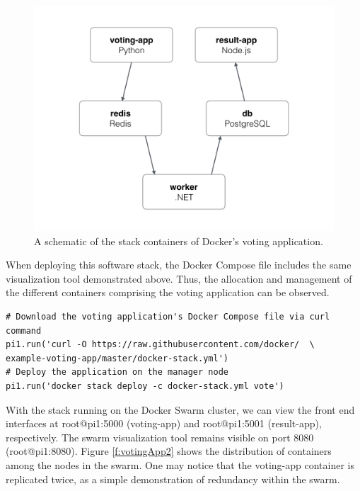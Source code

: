 \documentclass[sigconf]{acmart}
\begin{document}
\begin{figure}[!ht]
  \centering\includegraphics[width=\columnwidth]{images/votingApp.png}
  \caption{A schematic of the stack containers of Docker's voting application.}\label{f:votingApp}
\end{figure}

When deploying this software stack, the Docker Compose file includes the same visualization tool demonstrated above. Thus, 
the allocation and management of the different containers comprising the voting application can be observed.

\begin{lstlisting}
# Download the voting application's Docker Compose file via curl command
pi1.run('curl -O https://raw.githubusercontent.com/docker/  \
example-voting-app/master/docker-stack.yml')
# Deploy the application on the manager node
pi1.run('docker stack deploy -c docker-stack.yml vote')
\end{lstlisting}

With the stack running on the Docker Swarm cluster, we can view the front end interfaces at root@pi1:5000 (voting-app) and 
root@pi1:5001 (result-app), respectively. The swarm visualization tool remains visible on port 8080 (root@pi1:8080). Figure 
\ref{f:votingApp2} shows the distribution of containers among the nodes in the swarm. One may notice that the voting-app 
container is replicated twice, as a simple demonstration of redundancy within the swarm.
\end{document}
